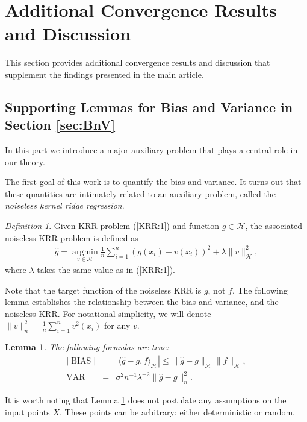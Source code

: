 \documentclass[12pt]{article}
\theoremstyle{plain}
\newtheorem{lemma}{Lemma}
\theoremstyle{remark}
\newtheorem{definition}{Definition}
\begin{document}
\section{Additional Convergence Results and Discussion}\label{sec:results}

This section provides additional convergence results and discussion that supplement the findings presented in the main article.


\subsection{Supporting Lemmas for Bias and Variance in Section \ref{sec:BnV}}
In this part we introduce a major auxiliary problem that plays a central role in our theory. 

The first goal of this work is to quantify the bias and variance. It turns out that these quantities are intimately related to an auxiliary problem, called the \textit{noiseless kernel ridge regression}.

\begin{definition}
    Given KRR problem (\ref{KRR:1}) and function $g\in\mathcal{H}$, the associated noiseless KRR problem is defined as
    \begin{eqnarray}
        \hat{g}=\operatorname*{argmin}_{v\in\mathcal{H}}\frac{1}{n}\sum_{i=1}^n(g(x_i)-v(x_i))^2+\lambda \|v\|^2_{\mathcal{H}},
    \end{eqnarray}
    where $\lambda$ takes the same value as in (\ref{KRR:1}).
\end{definition}

Note that the target function of the noiseless KRR is $g$, not $f$.
The following lemma establishes the relationship between the bias and variance, and the noiseless KRR. For notational simplicity, we will denote $\|v\|^2_n=\frac{1}{n}\sum_{i=1}^n v^2(x_i)$ for any $v$.

\begin{lemma}\label{lemma:relationship}
The following formulas are true:
\begin{eqnarray}
    |\operatorname{BIAS}|&=&|\langle\hat{g}-g,f\rangle_\mathcal{H}| \leq\|\hat{g}-g\|_{\mathcal{H}}\|f\|_{\mathcal{H}},\label{cauchy}\\
    \operatorname{VAR}&=&\sigma^2n^{-1}\lambda^{-2}\|\hat{g}-g\|^2_n.\nonumber
\end{eqnarray}
\end{lemma}

It is worth noting that Lemma \ref{lemma:relationship} does not postulate any assumptions on the input points $X$. These points can be arbitrary: either deterministic or random.
\end{document}
